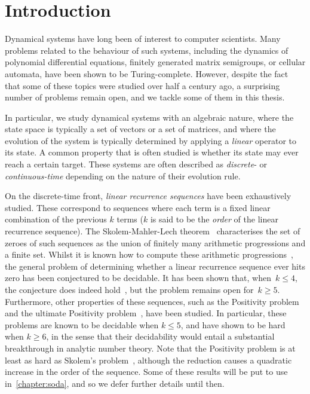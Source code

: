 \chapter{Introduction}
\label{sec:introduction}

Dynamical systems have long been of interest to computer scientists. Many problems related to the behaviour of such systems, including the dynamics of polynomial differential equations, finitely generated matrix semigroups, or cellular automata, have been shown to be Turing-complete. However, despite the fact that some of these topics were studied over half a century ago, a surprising number of problems remain open, and we tackle some of them in this thesis.

In particular, we study dynamical systems with an algebraic nature, where the state space is typically a set of vectors or a set of matrices, and where the evolution of the system is typically determined by applying a \emph{linear} operator to its state. A common property that is often studied is whether its state may ever reach a certain target. These systems are often described as \emph{discrete}- or \emph{continuous-time} depending on the nature of their evolution rule.

On the discrete-time front, \emph{linear recurrence sequences} have been exhaustively studied. These correspond to sequences where each term is a fixed linear combination of the previous $k$ terms ($k$ is said to be the \emph{order} of the linear recurrence sequence). The Skolem-Mahler-Lech theorem~\cite{Sko34,Mah35,Lec53,Hansel85} characterises the set of zeroes of such sequences as the union of finitely many arithmetic progressions and a finite set. Whilst it is known how to compute these arithmetic progressions~\cite{BM76}, the general problem of determining whether a linear recurrence sequence ever hits zero has been conjectured to be decidable. It has been shown that, when~$k \leq 4$, the conjecture does indeed hold~\cite{Ver85}, but the problem remains open for~$k\geq 5$.
Furthermore, other properties of these sequences, such as the Positivity problem~\cite{BG07,HHH06,LT09,OW13:constructive-positivity,OW14:SODA,Liu10} and the ultimate Positivity problem~\cite{OuaknineW13b}, have been studied.
In particular, these problems are known to be decidable when $k \leq 5$, and have shown to be hard when $k \geq 6$, in the sense that their decidability would entail a substantial breakthrough in analytic number theory. Note that the Positivity problem is at least as hard as Skolem's problem~\cite{OW14:SODA}, although the reduction causes a quadratic increase in the order of the sequence. Some of these results will be put to use in~\cref{chapter:soda}, and so we defer further details until then.

